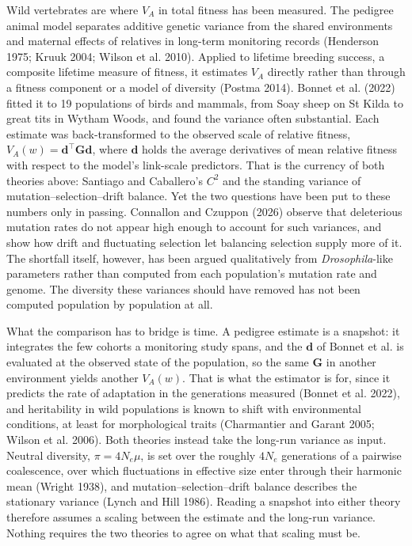 \documentclass[12pt]{article}
\begin{document}
Wild vertebrates are where $V_A$ in total fitness has been measured. The pedigree animal model separates additive genetic variance from the shared environments and maternal effects of relatives in long-term monitoring records (Henderson 1975; Kruuk 2004; Wilson et al. 2010). Applied to lifetime breeding success, a composite lifetime measure of fitness, it estimates $V_A$ directly rather than through a fitness component or a model of diversity (Postma 2014). Bonnet et al. (2022) fitted it to 19 populations of birds and mammals, from Soay sheep on St Kilda to great tits in Wytham Woods, and found the variance often substantial. Each estimate was back-transformed to the observed scale of relative fitness, $V_A(w) = \mathbf{d}^\top\mathbf{G}\mathbf{d}$, where $\mathbf{d}$ holds the average derivatives of mean relative fitness with respect to the model's link-scale predictors. That is the currency of both theories above: Santiago and Caballero's $C^2$ and the standing variance of mutation--selection--drift balance. Yet the two questions have been put to these numbers only in passing. Connallon and Czuppon (2026) observe that deleterious mutation rates do not appear high enough to account for such variances, and show how drift and fluctuating selection let balancing selection supply more of it. The shortfall itself, however, has been argued qualitatively from \textit{Drosophila}-like parameters rather than computed from each population's mutation rate and genome. The diversity these variances should have removed has not been computed population by population at all.

What the comparison has to bridge is time. A pedigree estimate is a snapshot: it integrates the few cohorts a monitoring study spans, and the $\mathbf{d}$ of Bonnet et al. is evaluated at the observed state of the population, so the same $\mathbf{G}$ in another environment yields another $V_A(w)$. That is what the estimator is for, since it predicts the rate of adaptation in the generations measured (Bonnet et al. 2022), and heritability in wild populations is known to shift with environmental conditions, at least for morphological traits (Charmantier and Garant 2005; Wilson et al. 2006). Both theories instead take the long-run variance as input. Neutral diversity, $\pi = 4N_e\mu$, is set over the roughly $4N_e$ generations of a pairwise coalescence, over which fluctuations in effective size enter through their harmonic mean (Wright 1938), and mutation--selection--drift balance describes the stationary variance (Lynch and Hill 1986). Reading a snapshot into either theory therefore assumes a scaling between the estimate and the long-run variance. Nothing requires the two theories to agree on what that scaling must be.
\end{document}
